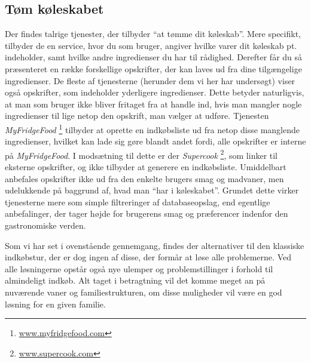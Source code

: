 \subsection{Tøm køleskabet} 
Der findes talrige tjenester, der tilbyder ``at tømme dit køleskab''.
Mere specifikt, tilbyder de en service, hvor du som bruger, angiver hvilke varer dit køleskab pt. indeholder, samt hvilke andre ingredienser du har til rådighed.
Derefter får du så præsenteret en række forskellige opskrifter, der kan laves ud fra dine tilgængelige ingredienser.
De fleste af tjenesterne (herunder dem vi her har undersøgt) viser også opskrifter, som indeholder yderligere ingredienser.
Dette betyder naturligvis, at man som bruger ikke bliver fritaget fra at handle ind, hvis man mangler nogle ingredienser til lige netop den opskrift, man vælger at udføre.
Tjenesten \textit{MyFridgeFood} \footnote{\underline{www.myfridgefood.com}} tilbyder at oprette en indkøbsliste ud fra netop disse manglende ingredienser, hvilket kan lade sig gøre blandt andet fordi, alle opskrifter er interne på \textit{MyFridgeFood}.
I modsætning til dette er der \textit{Supercook} \footnote{\underline{www.supercook.com}}, som linker til eksterne opskrifter, og ikke tilbyder at generere en indkøbsliste.
Umiddelbart anbefales opskrifter ikke ud fra den enkelte brugers smag og madvaner, men udelukkende på baggrund af, hvad man ``har i køleskabet''.
Grundet dette virker tjenesterne mere som simple filtreringer af databaseopslag, end egentlige anbefalinger, der tager højde for brugerens smag og præferencer indenfor den gastronomiske verden.

Som vi har set i ovenstående gennemgang, findes der alternativer til den klassiske indkøbstur, der er dog ingen af disse, der formår at løse alle problemerne.
Ved alle løsningerne opstår også nye ulemper og problemstillinger i forhold til almindeligt indkøb.
Alt taget i betragtning vil det komme meget an på nuværende vaner og familiestrukturen, om disse muligheder vil være en god løsning for en given familie.
